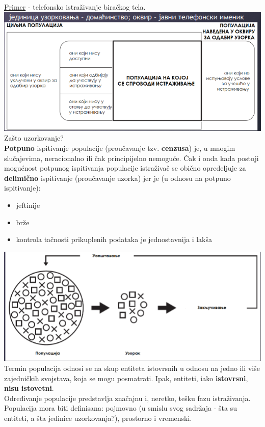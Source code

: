 \documentclass[10pt,a4paper,]{article}
\begin{document}
\underline{Primer} - telefonsko istraživanje biračkog tela.
\\[0.1cm]
\includegraphics[scale=0.5]{primer1}
\\[0.2cm]
Zašto uzorkovanje?
\\
\textbf{Potpuno} ispitivanje populacije 
(proučavanje tzv. \textbf{cenzusa}) je, u 
mnogim  slučajevima, neracionalno ili čak principijelno nemoguće. 
Čak i onda kada postoji mogućnost potpunog ispitivanja populacije 
istraživač se obično opredeljuje za \textbf{delimično} ispitivanje (proučavanje 
uzorka) jer je (u odnosu na potpuno ispitivanje):

\begin{itemize}
	\item jeftinije 
	\item brže
	\item kontrola tačnosti prikuplenih podataka je jednostavnija
	 i lakša
\end{itemize}

\includegraphics[scale=0.55]{primer2}
\\[0.25cm]

Termin populacija odnosi se na skup entiteta istovrsnih u odnosu 
na jedno ili više zajedničkih svojstava, koja se mogu posmatrati. 
Ipak, entiteti, iako \textbf{istovrsni}, \textbf{nisu istovetni}.
\\ 
Određivanje populacije 
predstavlja značajnu i, neretko, tešku fazu istraživanja. Populacija 
mora biti definisana: pojmovno (u smislu svog sadržaja - šta su 
entiteti, a šta jedinice uzorkovanja?), prostorno i vremenski.
\end{document}
